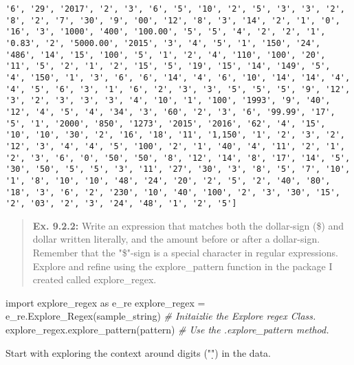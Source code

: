 \documentclass[11pt]{article}
\newenvironment{Shaded}{}{}
\newcommand{\CommentTok}[1]{\textcolor[rgb]{0.38,0.63,0.69}{\textit{{#1}}}}
\newcommand{\NormalTok}[1]{{#1}}
\newcommand{\ImportTok}[1]{{#1}}
\newcommand{\OperatorTok}[1]{\textcolor[rgb]{0.40,0.40,0.40}{{#1}}}
\begin{document}
\begin{Verbatim}[commandchars=\\\{\}]
'6', '29', '2017', '2', '3', '6', '5', '10', '2', '5', '3', '3', '2', '8', '2', '7', '30', '9', '00', '12', '8', '3', '14', '2', '1', '0', '16', '3', '1000', '400', '100.00', '5', '5', '4', '2', '2', '1', '0.83', '2', '5000.00', '2015', '3', '4', '5', '1', '150', '24', '486', '14', '15', '100', '5', '1', '2', '4', '110', '100', '20', '11', '5', '2', '1', '2', '15', '5', '19', '15', '14', '149', '5', '4', '150', '1', '3', '6', '6', '14', '4', '6', '10', '14', '14', '4', '4', '5', '6', '3', '1', '6', '2', '3', '3', '5', '5', '5', '9', '12', '3', '2', '3', '3', '3', '4', '10', '1', '100', '1993', '9', '40', '12', '4', '5', '4', '34', '3', '60', '2', '3', '6', '99.99', '17', '5', '1', '2000', '850', '1273', '2015', '2016', '62', '4', '15', '10', '10', '30', '2', '16', '18', '11', '1,150', '1', '2', '3', '2', '12', '3', '4', '4', '5', '100', '2', '1', '40', '4', '11', '2', '1', '2', '3', '6', '0', '50', '50', '8', '12', '14', '8', '17', '14', '5', '30', '50', '5', '5', '3', '11', '27', '30', '3', '8', '5', '7', '10', '1', '8', '10', '10', '48', '24', '20', '2', '5', '2', '40', '80', '18', '3', '6', '2', '230', '10', '40', '100', '2', '3', '30', '15', '2', '03', '2', '3', '24', '48', '1', '2', '5']

    \end{Verbatim}

    \begin{quote}
\textbf{Ex. 9.2.2:} Write an expression that matches both the
dollar-sign (\$) and dollar written literally, and the amount before or
after a dollar-sign. Remember that the "\$"-sign is a special character
in regular expressions. Explore and refine using the explore\_pattern
function in the package I created called explore\_regex.
\end{quote}

\begin{Shaded}
\begin{Highlighting}[]
\ImportTok{import}\NormalTok{ explore_regex }\ImportTok{as}\NormalTok{ e_re}
\NormalTok{explore_regex }\OperatorTok{=}\NormalTok{ e_re.Explore_Regex(sample_string) }\CommentTok{# Initaizlie the Explore regex Class.}
\NormalTok{explore_regex.explore_pattern(pattern) }\CommentTok{# Use the .explore_pattern method.}
\end{Highlighting}
\end{Shaded}

Start with exploring the context around digits ("\d") in the data.
\end{document}
